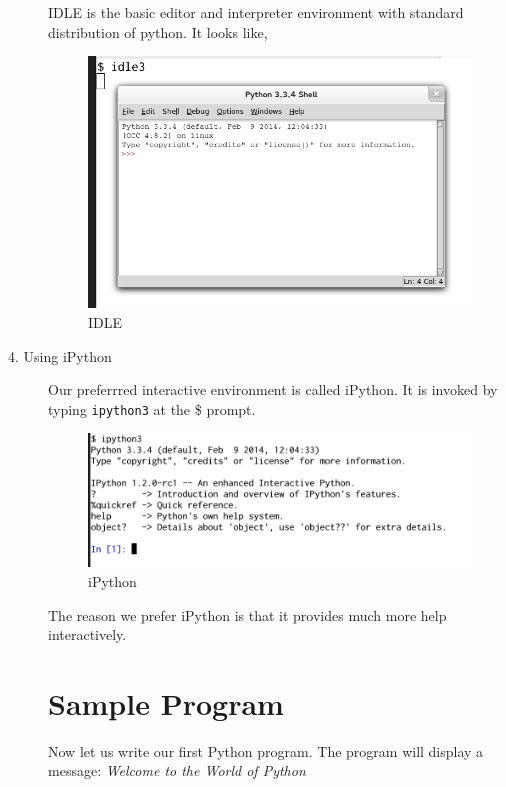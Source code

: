\documentclass[11pt,a4paper]{article}
\begin{document}
\begin{description}
IDLE is the basic editor and interpreter environment with standard distribution of python. It looks like,

\begin{figure}[ht]
\begin{center}
\includegraphics[scale=0.5]{02-IDLE.png}
\caption{IDLE}
\label{IDLE}
\end{center}
\end{figure}

\item[4. Using iPython] Our preferrred interactive environment is called iPython. It is invoked by typing \texttt{ipython3} at the \$ prompt. 
\begin{figure}[ht]
\begin{center}
\includegraphics[scale=0.5]{03-iPython.png}
\caption{iPython}
\label{ipython}
\end{center}
\end{figure}

The reason we prefer iPython is that it provides much more help interactively.

\section*{Sample Program}
Now let us write our first Python program. The program will display a message: \emph{Welcome to the World of  Python}


\end{description}
\end{document}

